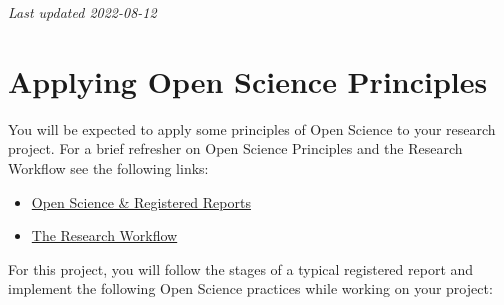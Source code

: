 \documentclass[
]{book}
\providecommand{\tightlist}{%
  \setlength{\itemsep}{0pt}\setlength{\parskip}{0pt}}
\begin{document}
\emph{Last updated 2022-08-12}

\hypertarget{applying-open-science-principles}{%
\chapter*{Applying Open Science Principles}\label{applying-open-science-principles}}

You will be expected to apply some principles of Open Science to your research project. For a brief refresher on Open Science Principles and the Research Workflow see the following links:

\begin{itemize}
\tightlist
\item
  \href{https://ubco-biology.github.io/BIOL-116-Lab-Manual/open-science.htmlhttps://ubco-biology.github.io/BIOL-116-Lab-Manual/open-science.html}{Open Science \& Registered Reports}
\item
  \href{https://ubco-biology.github.io/BIOL-116-Lab-Manual/the-research-workflow.html}{The Research Workflow}
\end{itemize}

For this project, you will follow the stages of a typical registered report and implement the following Open Science practices while working on your project:
\end{document}
